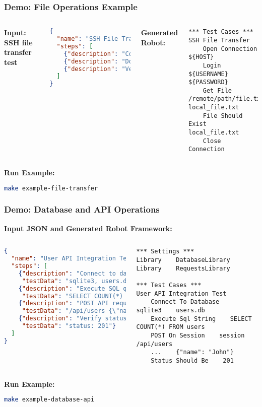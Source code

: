 \begin{frame}[fragile,t]
\frametitle{Demo: File Operations Example}
\begin{columns}
\textbf{Input: SSH file transfer test}
\begin{lstlisting}[language=json,basicstyle=\tiny]
{
  "name": "SSH File Transfer",
  "steps": [
    {"description": "Connect to remote server via SSH"},
    {"description": "Download file from /remote/path/file.txt"},
    {"description": "Verify file exists locally"}
  ]
}
\end{lstlisting}

\textbf{Generated Robot:}
\begin{lstlisting}[language=robot,basicstyle=\tiny]
*** Test Cases ***
SSH File Transfer
    Open Connection    ${HOST}
    Login    ${USERNAME}    ${PASSWORD}
    Get File    /remote/path/file.txt    local_file.txt
    File Should Exist    local_file.txt
    Close Connection
\end{lstlisting}
\end{columns}
\textbf{Run Example:}
\begin{lstlisting}[language=bash,basicstyle=\scriptsize]
make example-file-transfer
\end{lstlisting}
\end{frame}

\begin{frame}[fragile,t]
\frametitle{Demo: Database and API Operations}
\textbf{Input JSON and Generated Robot Framework:}

\begin{columns}[t]
\begin{lstlisting}[language=json,basicstyle=\tiny]
{
  "name": "User API Integration Test",
  "steps": [
    {"description": "Connect to database",
     "testData": "sqlite3, users.db"},
    {"description": "Execute SQL query",
     "testData": "SELECT COUNT(*) FROM users"},
    {"description": "POST API request",
     "testData": "/api/users {\"name\": \"John\"}"},
    {"description": "Verify status",
     "testData": "status: 201"}
  ]
}
\end{lstlisting}

\begin{lstlisting}[language=robot,basicstyle=\tiny]
*** Settings ***
Library    DatabaseLibrary
Library    RequestsLibrary

*** Test Cases ***
User API Integration Test
    Connect To Database    sqlite3    users.db
    Execute Sql String    SELECT COUNT(*) FROM users
    POST On Session    session    /api/users
    ...    {"name": "John"}
    Status Should Be    201
\end{lstlisting}
\end{columns}

\vspace{0.3cm}
\textbf{Run Example:}
\begin{lstlisting}[language=bash,basicstyle=\scriptsize]
make example-database-api
\end{lstlisting}
\end{frame}

